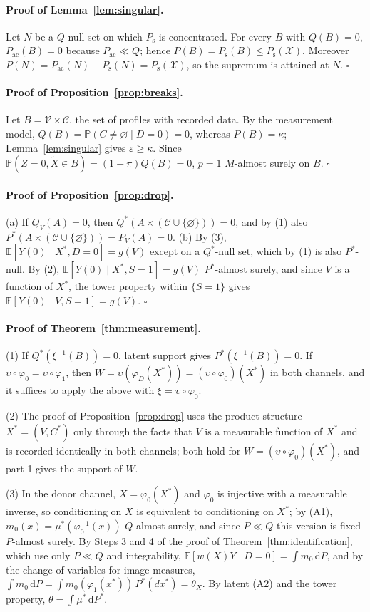 \documentclass[twoside,11pt]{article}
\newcommand{\E}{\mathbb{E}}
\newcommand{\PP}{\mathbb{P}}
\newcommand{\X}{\mathcal{X}}
\newcommand{\dd}{\,\mathrm{d}}
\newcommand{\Pac}{P_{\mathrm{ac}}}
\newcommand{\Ps}{P_{\mathrm{s}}}
\newcommand{\vacio}{\varnothing}
\theoremstyle{plain}
\theoremstyle{definition}
\begin{document}
\paragraph{Proof of Lemma~\ref{lem:singular}.}
Let $N$ be a $Q$-null set on which $\Ps$ is concentrated. For every $B$ with $Q(B)=0$, $\Pac(B)=0$ because $\Pac\ll Q$; hence $P(B)=\Ps(B)\le\Ps(\X)$. Moreover $P(N)=\Pac(N)+\Ps(N)=\Ps(\X)$, so the supremum is attained at $N$.
\hfill$\square$


\paragraph{Proof of Proposition~\ref{prop:breaks}.}
Let $B=\mathcal V\times\mathcal C$, the set of profiles with recorded data. By the measurement model, $Q(B)=\PP(C\ne\vacio\mid D=0)=0$, whereas $P(B)=\kappa$; Lemma~\ref{lem:singular} gives $\varepsilon\ge\kappa$. Since $\PP(Z=0,\tilde X\in B)=(1-\pi)Q(B)=0$, $p=1$ $M$-almost surely on $B$.
\hfill$\square$


\paragraph{Proof of Proposition~\ref{prop:drop}.}
(a) If $Q_V(A)=0$, then $Q^*(A\times(\mathcal C\cup\{\vacio\}))=0$, and by (1) also $P^*(A\times(\mathcal C\cup\{\vacio\}))=P_V(A)=0$.
(b) By (3), $\E[Y(0)\mid X^*,D=0]=g(V)$ except on a $Q^*$-null set, which by (1) is also $P^*$-null. By (2), $\E[Y(0)\mid X^*,S=1]=g(V)$ $P^*$-almost surely, and since $V$ is a function of $X^*$, the tower property within $\{S=1\}$ gives $\E[Y(0)\mid V,S=1]=g(V)$.
\hfill$\square$


\paragraph{Proof of Theorem~\ref{thm:measurement}.}
(1) If $Q^*(\xi^{-1}(B))=0$, latent support gives $P^*(\xi^{-1}(B))=0$. If $\upsilon\circ\varphi_0=\upsilon\circ\varphi_1$, then $W=\upsilon(\varphi_D(X^*))=(\upsilon\circ\varphi_0)(X^*)$ in both channels, and it suffices to apply the above with $\xi=\upsilon\circ\varphi_0$.

(2) The proof of Proposition~\ref{prop:drop} uses the product structure $X^*=(V,C^*)$ only through the facts that $V$ is a measurable function of $X^*$ and is recorded identically in both channels; both hold for $W=(\upsilon\circ\varphi_0)(X^*)$, and part 1 gives the support of $W$.

(3) In the donor channel, $X=\varphi_0(X^*)$ and $\varphi_0$ is injective with a measurable inverse, so conditioning on $X$ is equivalent to conditioning on $X^*$; by (A1), $m_0(x)=\mu^*(\varphi_0^{-1}(x))$ $Q$-almost surely, and since $P\ll Q$ this version is fixed $P$-almost surely. By Steps 3 and 4 of the proof of Theorem~\ref{thm:identification}, which use only $P\ll Q$ and integrability, $\E[w(X)Y\mid D=0]=\int m_0\dd P$, and by the change of variables for image measures, $\int m_0\dd P=\int m_0(\varphi_1(x^*))\,P^*(dx^*)=\theta_X$. By latent (A2) and the tower property, $\theta=\int\mu^*\dd P^*$.
\end{document}
